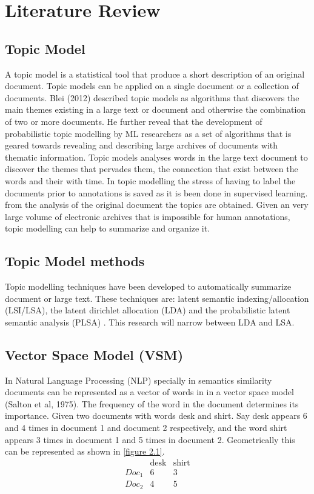 \chapter{Literature Review}
\section{Topic Model}  
A topic model is a statistical tool that produce a short description of an original document. Topic models can be applied on a single document or a collection of documents. Blei (2012) described topic models as algorithms that discovers the main themes existing in a large text or document and otherwise the combination of two or more documents. He further reveal that the development of probabilistic topic modelling by ML  researchers as a set of algorithms that is geared towards revealing and describing large archives of documents with thematic information. Topic models analyses words in the large text document to discover the themes that pervades them, the connection that exist between the words and their with time. In topic modelling the stress of having to label the documents prior to annotations is saved as it is been done in supervised learning. from the analysis of the original document the topics are obtained. Given an very large volume of electronic archives that is impossible for human annotations, topic modelling can help to summarize and organize it.
\section{Topic Model methods}
Topic modelling techniques have been developed to automatically summarize document or large text. These techniques are: latent semantic indexing/allocation  (LSI/LSA), the latent dirichlet allocation (LDA) and the probabilistic latent semantic analysis (PLSA) . This research will narrow between LDA and LSA.
\section{Vector Space Model (VSM)}
In Natural Language Processing (NLP) specially in semantics similarity documents can be represented as a vector of words in in a vector space model (Salton et al, 1975). The frequency of the word in the document determines its importance. Given two documents with words  desk and shirt. Say desk appears 6 and 4 times in document 1 and document 2 respectively, and the word shirt appears 3 times in document 1 and 5 times in document 2. Geometrically this can be represented as shown in \eqref{figure 2.1}.
$$\begin{array}{cccc}
 &\text{desk} & \text{shirt} \\ 
 Doc_1 & 6 & 3\\ 
 Doc_2 & 4 & 5
\end{array} $$

